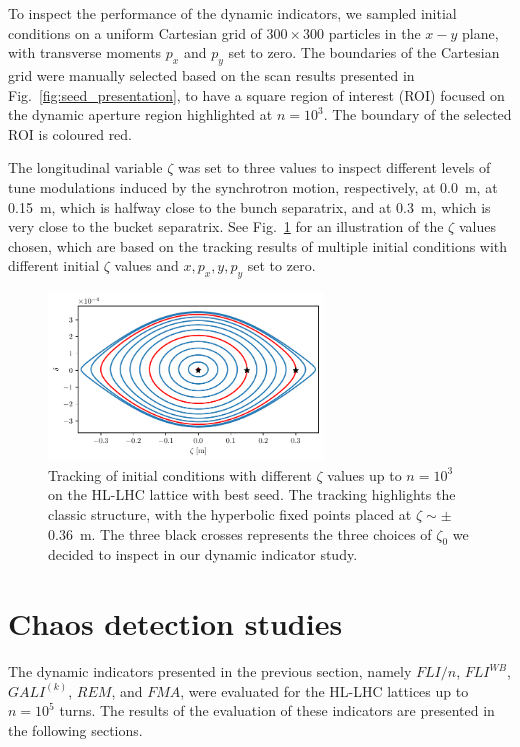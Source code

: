 To inspect the performance of the dynamic indicators, we sampled initial conditions on a uniform Cartesian grid of $300\times300$ particles in the $x-y$ plane, with transverse moments $p_x$ and $p_y$ set to zero. The boundaries of the Cartesian grid were manually selected based on the scan results presented in Fig.~\ref{fig:seed_presentation}, to have a square region of interest (ROI) focused on the dynamic aperture region highlighted at $n=10^3$. The boundary of the selected ROI is coloured red.

The longitudinal variable $\zeta$ was set to three values to inspect different levels of tune modulations induced by the synchrotron motion, respectively, at \SI{0.0}{\meter}, at \SI{0.15}{\meter}, which is halfway close to the bunch separatrix, and at \SI{0.3}{\meter}, which is very close to the bucket separatrix. See Fig.~\ref{fig:the_bunch} for an illustration of the $\zeta$ values chosen, which are based on the tracking results of multiple initial conditions with different initial $\zeta$ values and $x, p_x, y, p_y$ set to zero. 

\begin{figure}
    \centering
    \includegraphics[width=0.65\textwidth]{6_lhc_dynamic_indicators/figs/longitudinal.pdf}
    \caption{Tracking of initial conditions with different $\zeta$ values up to $n=10^3$ on the HL-LHC lattice with best seed. The tracking highlights the classic structure, with the hyperbolic fixed points placed at $\zeta \sim \pm$ \SI{0.36}{\meter}. The three black crosses represents the three choices of $\zeta_0$ we decided to inspect in our dynamic indicator study.}
    \label{fig:the_bunch}
\end{figure}

\section{Chaos detection studies} \label{sec:results}

The dynamic indicators presented in the previous section, namely $FLI/n$, $FLI^{WB}$, $GALI^{(k)}$, $REM$, and $FMA$, were evaluated for the HL-LHC lattices up to $n=10^5$ turns. The results of the evaluation of these indicators are presented in the following sections.

